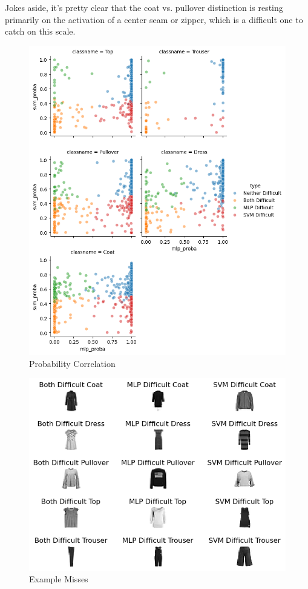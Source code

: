 \documentclass[12pt]{article}
\begin{document}
Jokes aside, it's pretty clear that the coat vs. pullover distinction is resting primarily on the activation of a center 
seam or zipper, which is a difficult one to catch on this scale.
\begin{figure}
    \includegraphics[width=.95\textwidth]{../results/difficulties.png}
    \caption{Probability Correlation}
    \label{figure4}
\end{figure}

\begin{figure}
    \includegraphics[width=.95\textwidth]{../results/Types_images.png}
    \caption{Example Misses}
    \label{figure5}
\end{figure}
\end{document}
